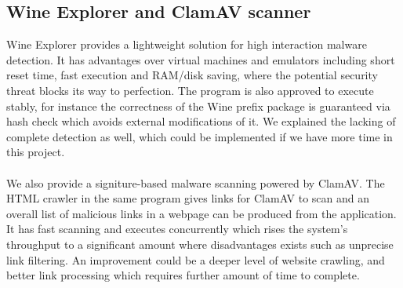 \subsection{Wine Explorer and ClamAV scanner}
Wine Explorer provides a lightweight solution for high interaction malware 
detection. It has advantages over virtual machines and emulators including 
short reset time, fast execution and RAM/disk saving, where the potential 
security threat blocks its way to perfection. The program is also approved to 
execute stably, for instance the correctness of the Wine prefix package is 
guaranteed via hash check which avoids external modifications of it. We 
explained the lacking of complete detection as well, which could be 
implemented if we have more time in this project. 
\paragraph{}
We also provide a signiture-based malware scanning powered by ClamAV. The 
HTML crawler in the same program gives links for ClamAV to scan and an 
overall list of malicious links in a webpage can be produced from the 
application. It has fast scanning and executes concurrently which rises 
the system's throughput to a significant amount where disadvantages exists 
such as unprecise link filtering. An improvement could be a deeper level of 
website crawling, and better link processing which requires further amount 
of time to complete. 
